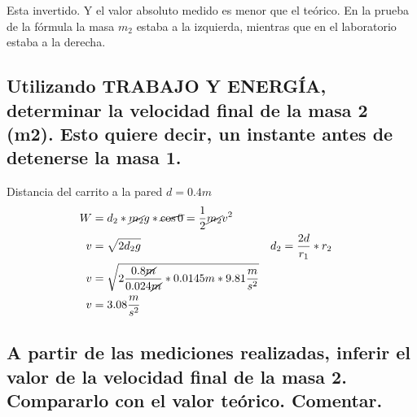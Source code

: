 \documentclass[12pt]{article}
\begin{document}
Esta invertido.
Y el valor absoluto medido es menor que el teórico.
En la prueba de la fórmula la masa $m_2$ estaba a la izquierda, mientras que en el laboratorio estaba a la derecha.

\subsection{Utilizando  TRABAJO  Y  ENERGÍA,
determinar  la  velocidad  final  de  la  masa  2 (m2).
Esto quiere decir, un instante antes de detenerse la masa 1.}%

Distancia del carrito a la pared $d=0.4m$
\begin{align*}
	W &= d_2*\cancel{m_2}g*\cancel{\cos{0}} = \frac{1}{2} \cancel{m_2}v^2\\
	v &= \sqrt{2d_2g} && d_2 =\frac{2d}{r_1}*r_2\\
	v &= \sqrt{2\frac{0.8\cancel{m}}{0.024\cancel{m}}*0.0145m*9.81 \frac{m}{s^2} }\\
	v &= 3.08\frac{m}{s^2}
\end{align*}

\subsection{A partir de las mediciones realizadas,
inferir el valor de la velocidad final de la masa 2.
Compararlo con el valor teórico.
Comentar.}%
\end{document}
